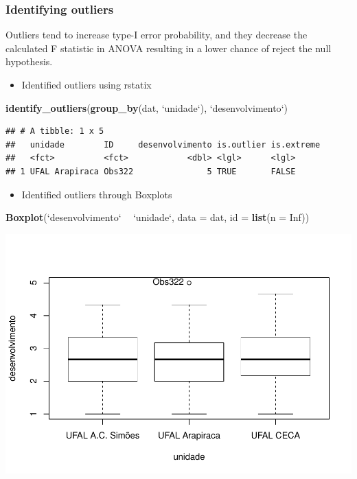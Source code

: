 \documentclass[]{article}
\newenvironment{Shaded}{\begin{snugshade}}{\end{snugshade}}
\newcommand{\DataTypeTok}[1]{\textcolor[rgb]{0.13,0.29,0.53}{#1}}
\newcommand{\KeywordTok}[1]{\textcolor[rgb]{0.13,0.29,0.53}{\textbf{#1}}}
\newcommand{\NormalTok}[1]{#1}
\newcommand{\OperatorTok}[1]{\textcolor[rgb]{0.81,0.36,0.00}{\textbf{#1}}}
\newcommand{\OtherTok}[1]{\textcolor[rgb]{0.56,0.35,0.01}{#1}}
\newcommand{\StringTok}[1]{\textcolor[rgb]{0.31,0.60,0.02}{#1}}
\providecommand{\tightlist}{%
  \setlength{\itemsep}{0pt}\setlength{\parskip}{0pt}}
\begin{document}
\hypertarget{identifying-outliers}{%
\subsubsection{Identifying outliers}\label{identifying-outliers}}

Outliers tend to increase type-I error probability, and they decrease
the calculated F statistic in ANOVA resulting in a lower chance of
reject the null hypothesis.

\begin{itemize}
\tightlist
\item
  Identified outliers using rstatix
\end{itemize}

\begin{Shaded}
\begin{Highlighting}[]
\KeywordTok{identify_outliers}\NormalTok{(}\KeywordTok{group_by}\NormalTok{(dat, }\StringTok{`}\DataTypeTok{unidade}\StringTok{`}\NormalTok{), }\StringTok{`}\DataTypeTok{desenvolvimento}\StringTok{`}\NormalTok{)}
\end{Highlighting}
\end{Shaded}

\begin{verbatim}
## # A tibble: 1 x 5
##   unidade        ID     desenvolvimento is.outlier is.extreme
##   <fct>          <fct>            <dbl> <lgl>      <lgl>     
## 1 UFAL Arapiraca Obs322               5 TRUE       FALSE
\end{verbatim}

\begin{itemize}
\tightlist
\item
  Identified outliers through Boxplots
\end{itemize}

\begin{Shaded}
\begin{Highlighting}[]
\KeywordTok{Boxplot}\NormalTok{(}\StringTok{`}\DataTypeTok{desenvolvimento}\StringTok{`} \OperatorTok{~}\StringTok{ `}\DataTypeTok{unidade}\StringTok{`}\NormalTok{, }\DataTypeTok{data =}\NormalTok{ dat, }\DataTypeTok{id =} \KeywordTok{list}\NormalTok{(}\DataTypeTok{n =} \OtherTok{Inf}\NormalTok{))}
\end{Highlighting}
\end{Shaded}

\includegraphics{factorialAnova_files/figure-latex/unnamed-chunk-3-1.pdf}
\end{document}
